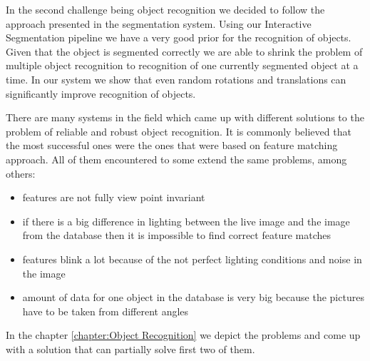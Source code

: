 In the second challenge being object recognition we decided to follow the approach presented in the segmentation system. Using our Interactive Segmentation pipeline we have a very good prior for the recognition of objects. Given that the object is segmented correctly we are able to shrink the problem of multiple object recognition to recognition of one currently segmented object at a time. In our system we show that even random rotations and translations can significantly improve recognition of objects.

There are many systems in the field which came up with different solutions to the problem of reliable and robust object recognition. It is commonly believed that the most successful ones were the ones that were based on feature matching approach. All of them encountered to some extend the same problems, among others:

\begin{itemize}
\item features are not fully view point invariant
\item if there is a big difference in lighting between the live image and the image from the database then it is impossible to find correct feature matches
\item features blink a lot because of the not perfect lighting conditions and noise in the image
\item amount of data for one object in the database is very big because the pictures have to be taken from different angles
\end{itemize}

In the chapter \ref{chapter:Object Recognition} we depict the problems and come up with a solution that can partially solve first two of them.
    

















